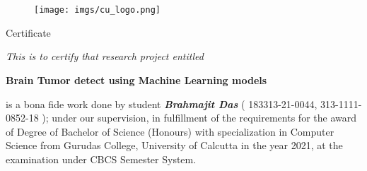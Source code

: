 
\section*{}
\label{sec:ceritficate}

\begin{figure}[h]
	\centering
	\texttt{[image: imgs/cu\_logo.png]}
	\caption*{}%
	\label{fig:cu_logo_cert}
\end{figure}



\begin{center}
	{ \Huge Certificate }

	\vspace{1cm}
	{ \Large \textit{This is to certify that research project entitled}}

	\vspace{1cm}
	{\Large \textbf{Brain Tumor detect using Machine Learning models} }

	\vspace{1cm}
	\onehalfspacing
	\begin{adjustwidth}{40pt}{40pt}
	{\Large
		is a bona fide work done by student \textit{ \textbf{Brahmajit Das}  } (
		183313-21-0044, 313-1111-0852-18 ); under our supervision, in
		fulfillment of the requirements for the award of Degree of Bachelor of
		Science (Honours) with specialization in Computer Science from Gurudas
		College, University of Calcutta in the year 2021, at the examination
		under CBCS Semester System.
	}
	\end{adjustwidth}
	\singlespacing
\end{center}

\vspace{0.5cm}

